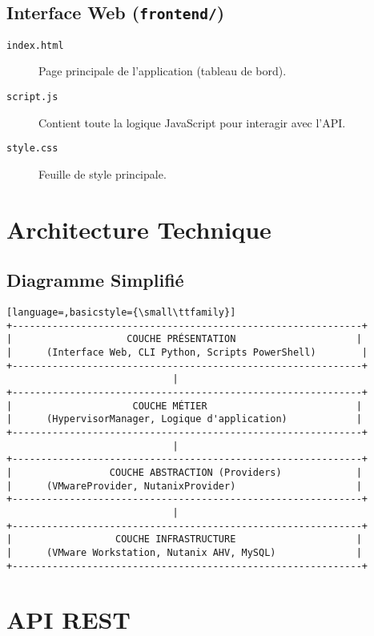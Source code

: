 \documentclass[11pt,a4paper]{article}
\begin{document}
\subsection{Interface Web (\texttt{frontend/})}
\begin{description}
    \item[\texttt{index.html}] Page principale de l'application (tableau de bord).
    \item[\texttt{script.js}] Contient toute la logique JavaScript pour interagir avec l'API.
    \item[\texttt{style.css}] Feuille de style principale.
\end{description}

\section{Architecture Technique}

\subsection{Diagramme Simplifié}
\begin{lstlisting}[language=,basicstyle={\small\ttfamily}]
+-------------------------------------------------------------+
|                    COUCHE PRÉSENTATION                     |
|      (Interface Web, CLI Python, Scripts PowerShell)        |
+-------------------------------------------------------------+
                             |
+-------------------------------------------------------------+
|                     COUCHE MÉTIER                          |
|      (HypervisorManager, Logique d'application)            |
+-------------------------------------------------------------+
                             |
+-------------------------------------------------------------+
|                 COUCHE ABSTRACTION (Providers)             |
|      (VMwareProvider, NutanixProvider)                     |
+-------------------------------------------------------------+
                             |
+-------------------------------------------------------------+
|                  COUCHE INFRASTRUCTURE                     |
|      (VMware Workstation, Nutanix AHV, MySQL)              |
+-------------------------------------------------------------+
\end{lstlisting}

\section{API REST}
\end{document}
